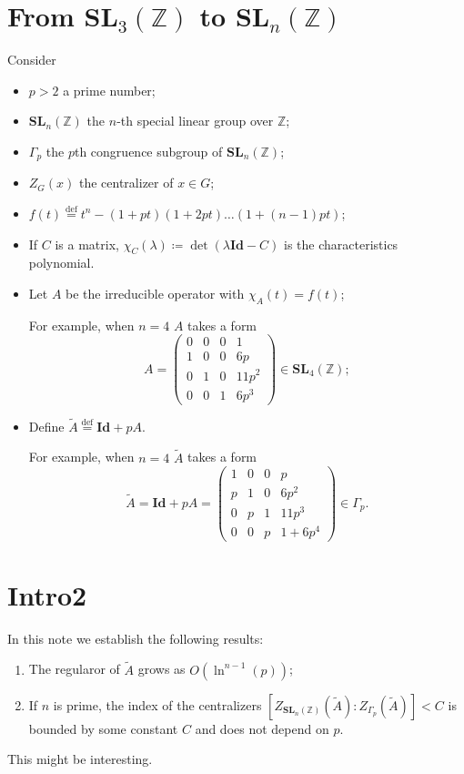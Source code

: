 \documentclass[a4paper]{article}
\newcommand{\eqdef}{\stackrel{\mathrm{def}}{=}}
\DeclareMathOperator{\assign}{\coloneqq}        %
\newcommand{\Id}{\mathbf{Id}}        %
\newcommand{\SL}{\mathbf{SL}_3(\mathbb{Z})}        %
\newcommand{\SLp}{\Gamma_p}        %
\newcommand{\SLn}{\mathbf{SL}_n(\mathbb{Z})}        %
\begin{document}
\newpage
\section{From $\SL$ to $\SLn$}

Consider
\begin{itemize}
\item $p > 2$ a prime number;
\item $\SLn$ the $n$-th special linear group over $\mathbb{Z}$;
\item $\SLp$ the $p$th congruence subgroup of $\SLn$;
\item $Z_G(x)$ the centralizer of $x \in G$;
\item $ f(t) \eqdef t^n - (1 + pt) (1 + 2pt) \ldots (1 + (n - 1) p t)$;
\item If $C$ is a matrix, $\chi_C(\lambda) \assign \det(\lambda \Id - C)$ is the characteristics polynomial.
\item Let $A$ be the irreducible operator with $\chi_A(t) = f(t)$; 

For example, when $n = 4$ $A$ takes a form
\begin{equation}
A = 
\begin{pmatrix}
0 & 0 & 0 & 1 \\
1 & 0 & 0 & 6 p \\
0 & 1 & 0 & 11 p^2 \\
0 & 0 & 1 & 6 p^3
\end{pmatrix}
\in {\mathbf{SL}_4(\mathbb{Z})};        %
\end{equation}
\item 
Define $\tilde A \eqdef \Id + p A$.

For example, when $n = 4$ $\tilde A$ takes a form
\begin{equation}
\tilde A = \Id + p A =
\begin{pmatrix}
1 & 0 & 0 & p \\
p & 1 & 0 & 6 p^2 \\
0 & p & 1 & 11 p^3 \\
0 & 0 & p & 1 + 6 p^4
\end{pmatrix}
\in \SLp.
\end{equation}
\end{itemize}

\section{Intro2}
In this note we establish the following results:
\begin{enumerate}
\item
The regularor of $\tilde A$
grows as $O (\ln^{n-1} (p)) $; 

\item
If $n$ is prime,
the index of the centralizers
$ [Z_{\SLn}(\tilde A) : Z_{\SLp}(\tilde A)] < C$
is bounded by some constant $C$ and does not depend on $p$.
\end{enumerate}
This might be interesting.
\end{document}

